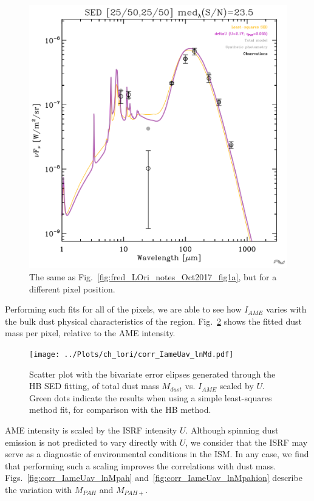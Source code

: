               \begin{figure}
                \includegraphics[width=\textwidth]{../Plots/ch_lori/fred_LOri_notes_Oct2017_fig1b.pdf}
                \centering
                \caption{The same as Fig.~\ref{fig:fred_LOri_notes_Oct2017_fig1a}, but for a different pixel position.}
                \label{fig:fred_LOri_notes_Oct2017_fig1b}
              \end{figure}
           Performing such fits for all of the pixels, we are able to see how $I_{AME}$ varies with the bulk dust physical characteristics of the region. Fig.~\ref{fig:corr_IameUav_lnMd} shows the fitted dust mass per pixel, relative to the AME intensity.
                \begin{figure}
                 \texttt{[image: ../Plots/ch\_lori/corr\_IameUav\_lnMd.pdf]}
                 \centering
                 \caption{Scatter plot with the bivariate error elipses generated through the HB SED fitting, of total dust mass $M_{dust}$ vs. $I_{AME}$ scaled by $U$. Green dots indicate the results when using a simple least-squares method fit, for comparison with the HB method.}
                 \label{fig:corr_IameUav_lnMd}
               \end{figure}
           AME intensity is scaled by the ISRF intensity $U$. Although spinning dust emission is not predicted to vary directly with $U$, we consider that the ISRF may serve as a diagnostic of environmental conditions in the ISM. In any case, we find that performing such a scaling improves the correlations with dust mass.   Figs.~\ref{fig:corr_IameUav_lnMpah} and~\ref{fig:corr_IameUav_lnMpahion} describe the variation with $M_{PAH}$ and $M_{PAH+}$.
